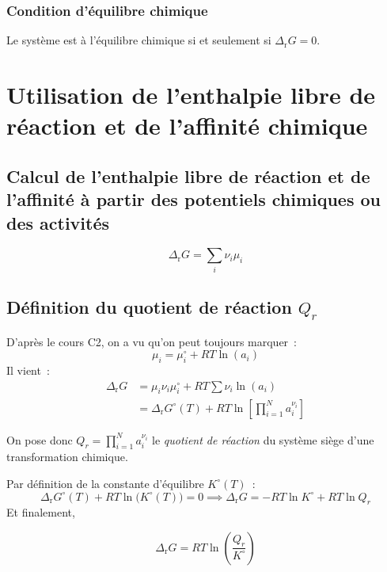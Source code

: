 \documentclass{article}
\newcommand{\ds}{\displaystyle}
\newcommand{\Dr}{\Delta_{\mathrm{r}}}
\begin{document}
\subsubsection{Condition d’équilibre chimique}
\begin{important}
    Le système est à l'équilibre chimique si et seulement si $\Dr G=0$.
\end{important}


\section{Utilisation de l’enthalpie libre de réaction et de l’affinité chimique}
\subsection{Calcul de l’enthalpie libre de réaction et de l’affinité à partir des potentiels chimiques ou des activités}
$$\Dr G = \sum_i \nu_i \mu_i$$

\subsection{Définition du quotient de réaction $Q_r$}
\begin{tableau}
    D'après le cours C2, on a vu qu'on peut toujours\footnotemark{} marquer~:
    $$\mu_i = \mu_i^\circ + RT\ln(a_i)$$
    Il vient~:
    \begin{align*}
        \Dr G &= \mu_i \nu_i\mu_i^\circ + RT\sum\nu_i \ln(a_i)\\
        &=\Dr G^\circ(T) + RT\ln\left[\prod_{i=1}^N a_i^{\nu_i}\right]
    \end{align*}
    \begin{important}
        On pose donc $Q_r=\ds\prod_{i=1}^N a_i^{\nu_i}$ le \textit{quotient de réaction} du système siège d'une transformation chimique.
    \end{important}
    Par définition de la constante d'équilibre $K^\circ(T)$~:
    $$\Dr G^\circ(T) + RT\ln\big(K^\circ(T)\big)=0 \implies \Dr G = -RT\ln K^\circ + RT\ln Q_r$$
    Et finalement,
    \begin{important}
        \begin{equation}\label{drgqrk}
            \Dr G = RT\ln\left(\frac{Q_r}{K^\circ}\right)
        \end{equation}
    \end{important}
\end{tableau}
\end{document}
